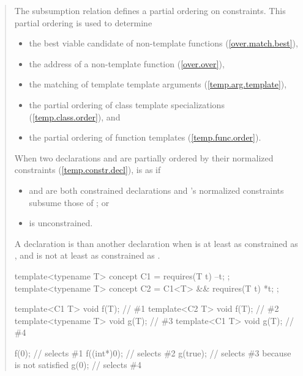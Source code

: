 \begin{quote}
\begin{addedblock}
\pnum
The subsumption relation defines a partial ordering on constraints. 
This partial ordering is used to determine
% 
\begin{itemize}
\item the best viable candidate of non-template functions
     (\ref{over.match.best}), 
\item the address of a non-template function
     (\ref{over.over}), 
\item the matching of template template arguments
     (\ref{temp.arg.template}), 
\item the partial ordering of class template specializations
     (\ref{temp.class.order}), and
\item the partial ordering of function templates
     (\ref{temp.func.order}).
\end{itemize}

\pnum
When two declarations  and  are
partially ordered by their normalized constraints (\ref{temp.constr.decl}), 
 is  as  if
% 
\begin{itemize}
\item {} and  are both constrained declarations and 
's normalized constraints subsume those of ; or

\item {} is unconstrained.
\end{itemize}

\pnum
A declaration  is 
than another declaration  when  is at least as
constrained as , and  is not at least as
constrained as .

\enterexample
\begin{codeblock}
template<typename T> concept C1 = requires(T t) { --t; };
template<typename T> concept C2 = C1<T> && requires(T t) { *t; };

template<C1 T> void f(T);       // \#1
template<C2 T> void f(T);       // \#2
template<typename T> void g(T); // \#3
template<C1 T> void g(T);       // \#4

f(0);       // selects \#1
f((int*)0); // selects \#2
g(true);    // selects \#3 because  is not satisfied
g(0);       // selects \#4
\end{codeblock}
\exitexample

\end{addedblock}
\end{quote}
